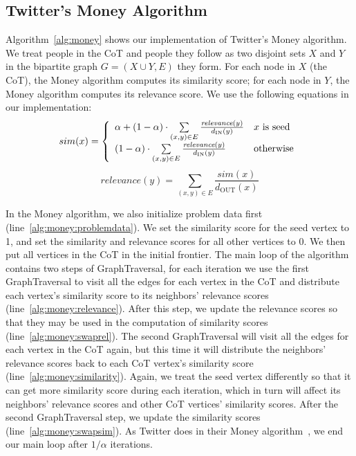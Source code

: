 \documentclass{article}
\renewcommand{\cite}[1]{}
\begin{document}
\subsection{Twitter's Money Algorithm} Algorithm~\ref{alg:money} shows our
implementation of Twitter's Money algorithm. We treat people in the CoT and
people they follow as two disjoint sets $X$ and $Y$ in the bipartite graph
$G = (X \cup Y, E)$ they form. For each node in $X$ (the CoT), the Money
algorithm computes its similarity score; for each node in $Y$, the Money
algorithm computes its relevance score. We use the following equations in
our implementation:
\begin{equation}
	sim(x) = \left\{
	\begin{array}{l l}
		\alpha + (1-\alpha) \cdot \sum\limits_{(x,y) \in E}
		\frac{\textit{relevance}(y)}{d_\text{IN}(y)} & \text{$x$ \textrm{is
				seed}}\\
		(1-\alpha) \cdot \sum\limits_{(x,y) \in E}
		\frac{\textit{relevance}(y)}{d_\text{IN}(y)} & \text{otherwise}
	\end{array} \right.
\end{equation}
\begin{equation}
	\textit{relevance}(y) = \sum\limits_{(x,y)\in E}
	\frac{\textit{sim}(x)}{d_\text{OUT}(x)}
\end{equation}

In the Money algorithm, we also initialize problem data first
(line~\ref{alg:money:problemdata}). We set the similarity score for the
seed vertex to 1, and set the similarity and relevance scores for all other
vertices to 0. We then put all vertices in the CoT in the initial frontier.
The main loop of the algorithm contains two steps of GraphTraversal, for
each iteration we use the first GraphTraversal to visit all the edges for
each vertex in the CoT and distribute each vertex's similarity score to its
neighbors' relevance scores (line~\ref{alg:money:relevance}). After this
step, we update the relevance scores so that they may be used in the
computation of similarity scores (line~\ref{alg:money:swaprel}). The second
GraphTraversal will visit all the edges for each vertex in the CoT again,
but this time it will distribute the neighbors' relevance scores back to
each CoT vertex's similarity score (line~\ref{alg:money:similarity}).
Again, we treat the seed vertex differently so that it can get more
similarity score during each iteration, which in turn will affect its
neighbors' relevance scores and other CoT vertices' similarity scores.
After the second GraphTraversal step, we update the similarity scores
(line~\ref{alg:money:swapsim}). As Twitter does in their Money
algorithm~\cite{Goel:2014:TWT}, we end our main loop after $1/\alpha$
iterations.
\end{document}
